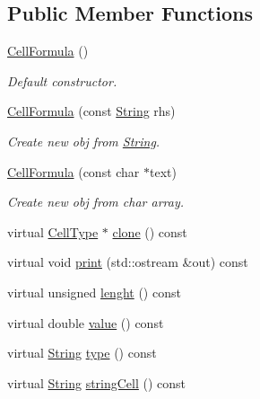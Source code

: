 \subsection*{Public Member Functions}
\begin{DoxyCompactItemize}
\item 
\mbox{\label{class_cell_formula_a6cec93558e2c0a980fab7e82596ad525}} 
\hyperlink{class_cell_formula_a6cec93558e2c0a980fab7e82596ad525}{Cell\+Formula} ()
\begin{DoxyCompactList}\small\item\em Default constructor. \end{DoxyCompactList}\item 
\mbox{\label{class_cell_formula_a45c45a54409a55c582bd3014ed1ded3a}} 
\hyperlink{class_cell_formula_a45c45a54409a55c582bd3014ed1ded3a}{Cell\+Formula} (const \hyperlink{class_string}{String} rhs)
\begin{DoxyCompactList}\small\item\em Create new obj from \hyperlink{class_string}{String}. \end{DoxyCompactList}\item 
\mbox{\label{class_cell_formula_a827017b1efe9ed2891a293cc80469559}} 
\hyperlink{class_cell_formula_a827017b1efe9ed2891a293cc80469559}{Cell\+Formula} (const char $\ast$text)
\begin{DoxyCompactList}\small\item\em Create new obj from char array. \end{DoxyCompactList}\item 
virtual \hyperlink{class_cell_type}{Cell\+Type} $\ast$ \hyperlink{class_cell_formula_a23c26c40ef7056d9395ed8bc4ebef3b9}{clone} () const
\item 
virtual void \hyperlink{class_cell_formula_ac8cfeff2585811ee01acb7a4ddf25723}{print} (std\+::ostream \&out) const
\item 
virtual unsigned \hyperlink{class_cell_formula_af188e3f639245c126e0ae30e17b8d3c0}{lenght} () const
\item 
virtual double \hyperlink{class_cell_formula_a29d9e3000ae3f0b0ebac72807a455fec}{value} () const
\item 
virtual \hyperlink{class_string}{String} \hyperlink{class_cell_formula_ae175fd79ee036efa3a968f37b8eb53bc}{type} () const
\item 
virtual \hyperlink{class_string}{String} \hyperlink{class_cell_formula_abe70a7ace4b58fe4154bacccb5e3c12c}{string\+Cell} () const
\end{DoxyCompactItemize}


